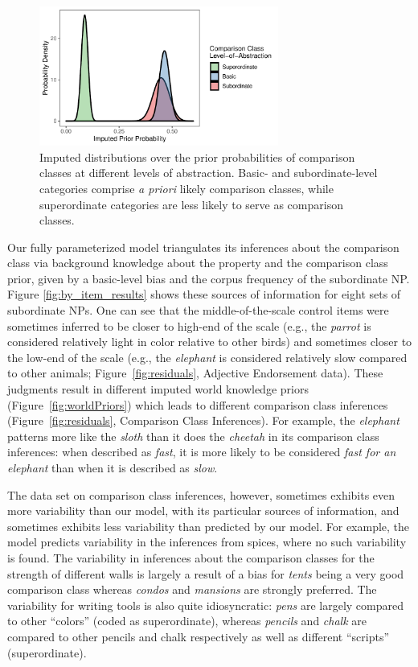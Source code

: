 \documentclass[doc]{apa6}
\begin{document}
\begin{figure}[t]
\centering
\includegraphics[width=0.7\textwidth]{figs/model_comparisonClassPriorParameters.pdf}
\caption{Imputed distributions over the prior probabilities of comparison classes at different levels of abstraction. Basic- and subordinate-level categories comprise \emph{a priori} likely comparison classes, while superordinate categories are less likely to serve as comparison classes.}\label{fig:parameters}
\end{figure}


Our fully parameterized model triangulates its inferences about the comparison class via background knowledge about the property and the comparison class prior, given by a basic-level bias and the corpus frequency of the subordinate NP. Figure \ref{fig:by_item_results} shows these sources of information for eight sets of subordinate NPs. 
One can see that the middle-of-the-scale control items were sometimes inferred to be closer to high-end of the scale (e.g., the \emph{parrot} is considered relatively light in color relative to other birds) and sometimes closer to the low-end of the scale (e.g., the \emph{elephant} is considered relatively slow compared to other animals; Figure~\ref{fig:residuals}, Adjective Endorsement data). These judgments result in different imputed  world knowledge priors (Figure~\ref{fig:worldPriors}) which leads to different comparison class inferences (Figure~\ref{fig:residuals}, Comparison Class Inferences). For example, the \emph{elephant} patterns more like the \emph{sloth} than it does the \emph{cheetah} in its comparison class inferences: when described as \emph{fast}, it is more likely to be considered \emph{fast for an elephant} than when it is described as \emph{slow}.

The data set on comparison class inferences, however, sometimes exhibits even more variability than our model, with its particular sources of information, and sometimes exhibits less variability than predicted by our model. 
For example, the model predicts variability in the inferences from spices, where no such variability is found. 
The variability in inferences about the comparison classes for the strength of different walls is largely a result of a bias for \emph{tents} being a very good comparison class whereas \emph{condos} and \emph{mansions} are strongly preferred.
The variability for writing tools is also quite idiosyncratic: \emph{pens} are largely compared to other ``colors'' (coded as superordinate), whereas \emph{pencils} and \emph{chalk} are compared to other pencils and chalk respectively as well as different ``scripts'' (superordinate). 
\end{document}
